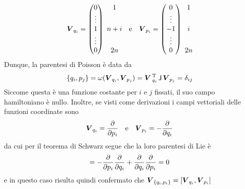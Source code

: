 \begin{equation}
  \vec{V}_{q_i} = \pmqty{0 \\ \vdots \\ 1 \\ \vdots \\ 0}\ \mqty{1 \\ \phantom{\vdots} \\ n+i \\ \phantom{\vdots} \\ 2n} \qqtext{e} 
  \vec{V}_{p_i} = \pmqty{0 \\ \vdots \\ -1 \\ \vdots \\ 0}\ \mqty{1 \\ \phantom{\vdots} \\ i \\ \phantom{\vdots} \\ 2n}
\end{equation} 
Dunque, la parentesi di Poisson è data da
\begin{equation}
\pb{q_i}{p_j} = \omega(\vec{V}_{q_i}, \vec{V}_{p_j}) = \vec{V}\,\transpose_{q_i}\, \mathsf{J}\, \vec{V}_{p_j} = \delta_{ij}
\end{equation}
Siccome questa è una funzione costante per $i$ e $j$ fissati, il suo campo hamiltoniano è nullo. Inoltre, se visti come derivazioni i campi vettoriali delle funzioni coordinate sono 
\begin{equation}
\vec{V}_{q_i} = \pdv{p_i} \qqtext{e} \vec{V}_{p_i} = -\pdv{q_i}
\end{equation}
da cui per il teorema di Schwarz segue che la loro parentesi di Lie è 
\begin{equation}
[V_{q_i}, V_{p_i}] = -\pdv{p_i}\pdv{q_i} + \pdv{q_i}\pdv{p_i} = 0
\end{equation}
e in questo caso risulta quindi confermato che $\vec{V}_{\pb{q_i}{p_i}} = [\vec{V}_{q_i}, \vec{V}_{p_i}]$

